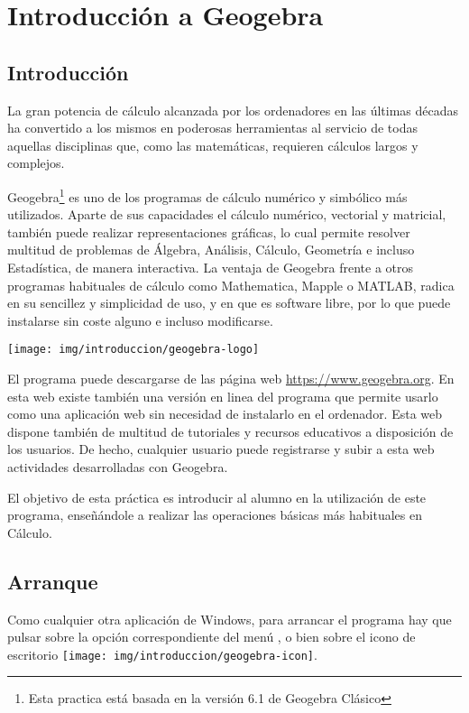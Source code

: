 \chapter{Introducción a Geogebra}

\section{Introducción}
La gran potencia de cálculo alcanzada por los ordenadores en las últimas décadas ha convertido a los mismos en poderosas herramientas al servicio de todas aquellas disciplinas que, como las matemáticas, requieren cálculos largos y complejos.

Geogebra\footnote{Esta practica está basada en la versión 6.1 de Geogebra Clásico} es uno de los programas de cálculo numérico y simbólico más utilizados.
Aparte de sus capacidades el cálculo numérico, vectorial y matricial, también puede realizar representaciones gráficas, lo cual permite resolver multitud de problemas de Álgebra, Análisis, Cálculo, Geometría e incluso Estadística, de manera interactiva.
La ventaja de Geogebra frente a otros programas habituales de cálculo como Mathematica, Mapple o MATLAB, radica en su sencillez y simplicidad de uso, y en que es software libre, por lo que puede instalarse sin coste alguno e incluso modificarse.

\begin{center}
\texttt{[image: img/introduccion/geogebra-logo]}
\end{center}

El programa puede descargarse de las página web \url{https://www.geogebra.org}.
En esta web existe también una versión en linea del programa que permite usarlo como una aplicación web sin necesidad de instalarlo en el ordenador.
Esta web dispone también de multitud de tutoriales y recursos educativos a disposición de los usuarios.
De hecho, cualquier usuario puede registrarse y subir a esta web actividades desarrolladas con Geogebra.

El objetivo de esta práctica es introducir al alumno en la utilización de este programa, enseñándole a realizar las operaciones básicas más habituales en Cálculo.

\section{Arranque}
Como cualquier otra aplicación de Windows, para arrancar el programa hay que pulsar sobre la opción correspondiente del menú , o bien sobre el icono de escritorio \texttt{[image: img/introduccion/geogebra-icon]}.

